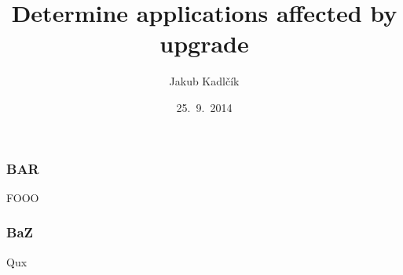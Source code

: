 \documentclass{beamer}
\title[tracer]{Determine applications affected by upgrade}
\author{Jakub Kadlčík}
\institute[UPOL]{Univerzita Palackého v Olomouci}
\date{25.~9.~2014}
\begin{document}
	\begin{frame}
		\titlepage
	\end{frame}

	\begin{frame}
		\frametitle{BAR}
		FOOO
	\end{frame}

	\begin{frame}
		\frametitle{BaZ}
		Qux
	\end{frame}
\end{document}
